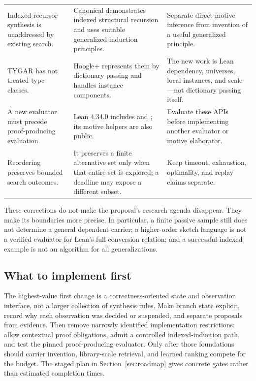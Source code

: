 \documentclass[11pt,a4paper]{article}
\newcommand{\code}[1]{\texttt{\detokenize{#1}}}
\theoremstyle{definition}
\theoremstyle{remark}
\begin{document}
\begin{longtable}{@{}P{36mm}P{55mm}P{58mm}@{}}
Indexed recursor synthesis is unaddressed by existing search. & Canonical demonstrates indexed structural recursion and uses suitable generalized induction principles.\cite{canonical} & Separate direct motive inference from invention of a useful generalized principle.\\[4pt]
TYGAR has not treated type classes. & Hoogle+ represents them by dictionary passing and handles instance components.\cite{hoogle} & The new work is Lean dependency, universes, local instances, and scale---not dictionary passing itself.\\[4pt]
A new evaluator must precede proof-producing evaluation. & Lean 4.34.0 includes \code{cbv} and \code{decide_cbv}; its motive helpers are also public.\cite{lean-cbv,lean-induction} & Evaluate these APIs before implementing another evaluator or motive elaborator.\\[4pt]
Reordering preserves bounded search outcomes. & It preserves a finite alternative set only when that entire set is explored; a deadline may expose a different subset. & Keep timeout, exhaustion, optimality, and replay claims separate.\\
\bottomrule
\end{longtable}

These corrections do not make the proposal's research agenda disappear. They make its boundaries more precise. In particular, a finite passive sample still does not determine a general dependent carrier; a higher-order sketch language is not a verified evaluator for Lean's full conversion relation; and a successful indexed example is not an algorithm for all generalizations.

\subsection{What to implement first}

The highest-value first change is a correctness-oriented state and observation interface, not a larger collection of synthesis rules. Make branch state explicit, record why each observation was decided or suspended, and separate proposals from evidence. Then remove narrowly identified implementation restrictions: allow contextual proof obligations, admit a controlled indexed-induction path, and test the pinned proof-producing evaluator. Only after those foundations should carrier invention, library-scale retrieval, and learned ranking compete for the budget. The staged plan in Section~\ref{sec:roadmap} gives concrete gates rather than estimated completion times.
\end{document}
